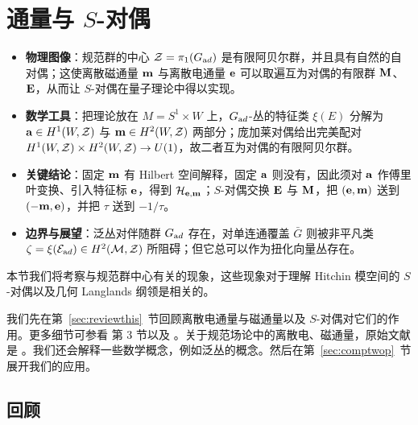 
\section{通量与 $S$-对偶}

\label{sec:centertop}

\begin{keytakeaways}
  \begin{itemize}[leftmargin=1.4em,itemsep=2pt,topsep=2pt]
    \item \textbf{物理图像}：规范群的中心 $\CZ=\pi_1(G_{\rm ad})$ 是有限阿贝尔群，并且具有自然的自对偶；这使离散磁通量 ${\bf m}$ 与离散电通量 ${\bf e}$ 可以取遍互为对偶的有限群 ${\bf M}$、${\bf E}$，从而让 $S$-对偶在量子理论中得以实现。
    \item \textbf{数学工具}：把理论放在 $M=S^1\times W$ 上，$\Gad$-丛的特征类 $\xi(E)$ 分解为 ${\bf a}\in H^1(W,\CZ)$ 与 ${\bf m}\in H^2(W,\CZ)$ 两部分；庞加莱对偶给出完美配对 $H^1(W,\CZ)\times H^2(W,\CZ)\to U(1)$，故二者互为对偶的有限阿贝尔群。
    \item \textbf{关键结论}：固定 ${\bf m}$ 有 Hilbert 空间解释，固定 ${\bf a}$ 则没有，因此须对 ${\bf a}$ 作傅里叶变换、引入特征标 ${\bf e}$，得到 ${\cal H}_{{\bf e},{\bf m}}$；$S$-对偶交换 ${\bf E}$ 与 ${\bf M}$，把 $({\bf e},{\bf m})$ 送到 $(-{\bf m},{\bf e})$，并把 $\tau$ 送到 $-1/\tau$。
    \item \textbf{边界与展望}：泛丛对伴随群 $G_{\rm ad}$ 存在，对单连通覆盖 $\bar G$ 则被非平凡类 $\zeta=\xi(\EUE_{\rm ad})\in H^2(\M,\CZ)$ 所阻碍；但它总可以作为扭化向量丛存在。
  \end{itemize}
\end{keytakeaways}

本节我们将考察与规范群中心有关的现象，这些现象对于理解 Hitchin 模空间的 $S$-对偶以及几何 Langlands 纲领是相关的。

我们先在第~\ref{sec:reviewthis}~节回顾离散电通量与磁通量以及 $S$-对偶对它们的作用。更多细节可参看 \cite{ref45} 第 3 节以及 \cite{ref26}。关于规范场论中的离散电、磁通量，原始文献是 \cite{ref101}。我们还会解释一些数学概念，例如泛丛的概念。然后在第~\ref{sec:comptwop}~节展开我们的应用。

\subsection{回顾}

